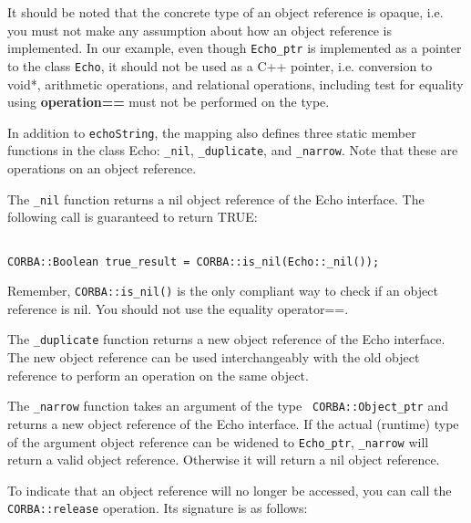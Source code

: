 \documentclass[11pt,twoside,onecolumn]{book}
\begin{document}
It should be noted that the concrete type of an object reference is opaque,
i.e. you must not make any assumption about how an object reference is
implemented. In our example, even though {\tt Echo\_ptr} is implemented as
a pointer to the class {\tt Echo}, it should not be used as a C++ pointer,
i.e. conversion to void*, arithmetic operations, and relational operations,
including test for equality using {\bf operation==} must not be performed
on the type.

In addition to {\tt echoString}, the mapping also defines three static
member functions in the class Echo: {\tt \_nil}, {\tt \_duplicate}, and 
{\tt \_narrow}. Note that these are operations on an object reference. 

The {\tt \_nil} function returns a nil object reference of the Echo interface. The
following call is guaranteed to return TRUE:

{\small
\begin{verbatim}

CORBA::Boolean true_result = CORBA::is_nil(Echo::_nil());

\end{verbatim}
}

Remember, {\tt CORBA::is\_nil()} is the only compliant way to check if an
object reference is nil. You should not use the equality operator==.

The {\tt \_duplicate} function returns a new object reference of the Echo
interface. The new object reference can be used interchangeably with the old
object reference to perform an operation on the same object.



The {\tt \_narrow} function takes an argument of the type {\tt
CORBA::Object\_ptr} and returns a new object reference of the Echo
interface.  If the actual (runtime) type of the argument object reference
can be widened to {\tt Echo\_ptr}, {\tt \_narrow} will return a valid object
reference. Otherwise it will return a nil object reference.

To indicate that an object reference will no longer be accessed, you can
call the {\tt CORBA::release} operation. Its signature is as follows:
\end{document}
